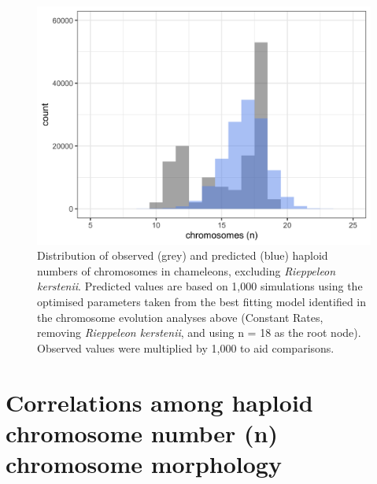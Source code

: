 \documentclass[a4paper, 12pt]{article}
\begin{document}
\newpage
\begin{figure}[H]
 \centering
  \includegraphics[width = \linewidth]{figures/chromevol-simulations-numbers.png}
  \caption{Distribution of observed (grey) and predicted (blue) haploid numbers of chromosomes in chameleons, excluding \textit{Rieppeleon kerstenii}. Predicted values are based on 1,000 simulations using the optimised parameters taken from the best fitting model identified in the chromosome evolution analyses above (Constant Rates, removing \textit{Rieppeleon kerstenii}, and using n = 18 as the root node). Observed values were multiplied by 1,000 to aid comparisons.
}
  \label{fig-otus-predicted}
\end{figure} 

\newpage
\section{Correlations among haploid chromosome number (n) chromosome morphology}
\end{document}
